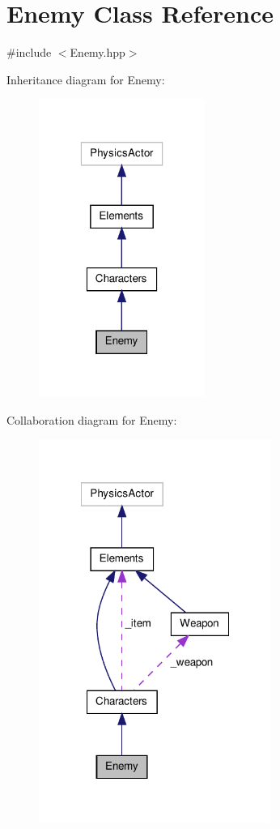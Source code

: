 \hypertarget{class_enemy}{\section{Enemy Class Reference}
\label{class_enemy}
}


{\ttfamily \#include $<$Enemy.\-hpp$>$}



Inheritance diagram for Enemy\-:
\nopagebreak
\begin{figure}[H]
\begin{center}
\leavevmode
\includegraphics[width=154pt]{class_enemy__inherit__graph}
\end{center}
\end{figure}


Collaboration diagram for Enemy\-:
\nopagebreak
\begin{figure}[H]
\begin{center}
\leavevmode
\includegraphics[width=215pt]{class_enemy__coll__graph}
\end{center}
\end{figure}
